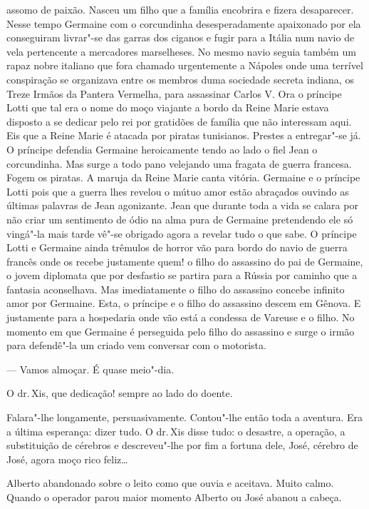 assomo de paixão. Nasceu um filho que a família encobrira e fizera
desaparecer. Nesse tempo Germaine com o corcundinha desesperadamente
apaixonado por ela conseguiram livrar"-se das garras dos ciganos e fugir
para a Itália num navio de vela pertencente a mercadores marselheses. No
mesmo navio seguia também um rapaz nobre italiano que fora chamado
urgentemente a Nápoles onde uma terrível conspiração se organizava entre
os membros duma sociedade secreta indiana, os Treze Irmãos da Pantera
Vermelha, para assassinar Carlos V. Ora o príncipe Lotti que tal era o
nome do moço viajante a bordo da Reine Marie estava disposto a se
dedicar pelo rei por gratidões de família que não interessam aqui. Eis
que a Reine Marie é atacada por piratas tunisianos. Prestes a
entregar"-se já. O príncipe defendia Germaine heroicamente tendo ao lado
o fiel Jean o corcundinha. Mas surge a todo pano velejando uma fragata
de guerra francesa. Fogem os piratas. A maruja da Reine Marie canta
vitória. Germaine e o príncipe Lotti pois que a guerra lhes revelou o
mútuo amor estão abraçados ouvindo as últimas palavras de Jean
agonizante. Jean que durante toda a vida se calara por não criar um
sentimento de ódio na alma pura de Germaine pretendendo ele só vingá"-la
mais tarde vê"-se obrigado agora a revelar tudo o que sabe. O príncipe
Lotti e Germaine ainda trêmulos de horror vão para bordo do navio de
guerra francês onde os recebe justamente quem! o filho do assassino do
pai de Germaine, o jovem diplomata que por desfastio se partira para a
Rússia por caminho que a fantasia aconselhava. Mas imediatamente o filho
do assassino concebe infinito amor por Germaine. Esta, o príncipe e o
filho do assassino descem em Gênova. E justamente para a hospedaria onde
vão está a condessa de Vareuse e o filho. No momento em que Germaine é
perseguida pelo filho do assassino e surge o irmão para defendê"-la um
criado vem conversar com o motorista.

--- Vamos almoçar. É quase meio"-dia.

O dr.\,Xis, que dedicação! sempre ao lado do doente.

Falara"-lhe longamente, persuasivamente. Contou"-lhe então toda a
aventura. Era a última esperança: dizer tudo. O dr.\,Xis disse tudo: o
desastre, a operação, a substituição de cérebros e descreveu"-lhe por fim
a fortuna dele, José, cérebro de José, agora moço rico feliz\ldots{}

Alberto abandonado sobre o leito como que ouvia e aceitava. Muito calmo.
Quando o operador parou maior momento Alberto ou José abanou a cabeça.

